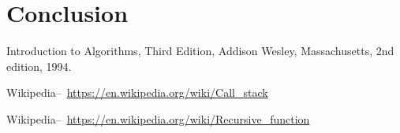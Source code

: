 \documentclass[12pt]{article}
\begin{document}
\section{Conclusion}

\pagebreak

\begin{thebibliography}{9}
	Introduction to Algorithms, Third Edition,
	Addison Wesley, Massachusetts,
	2nd edition,
	1994.
	
	Wikipedia–~\url{https://en.wikipedia.org/wiki/Call_stack}
	
	Wikipedia–~\url{https://en.wikipedia.org/wiki/Recursive_function}
	
\end{thebibliography}
\end{document}
